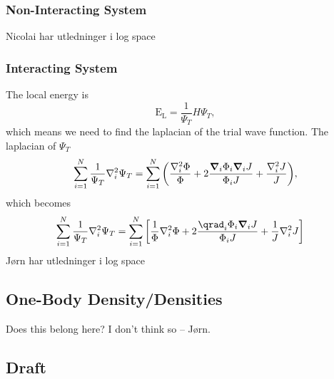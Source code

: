 \subsubsection*{Non-Interacting System}

Nicolai har utledninger i log space

\subsubsection*{Interacting System}
The local energy is 
\begin{equation}
    \mathrm{E}_{\mathrm{L}} = \frac{1}{\Psi_T}H\Psi_T, 
\end{equation}
which means we need to find the laplacian of the trial wave function. 
The laplacian of $\Psi_T$
\begin{equation}
    \sum_{i=1}^N\frac{1}{\Psi_T}\laplacian_i\Psi_T = \sum_{i=1}^N\qty(\frac{\laplacian_i\Phi}{\Phi} + 2\frac{\grad_i\Phi_i\grad_i J}{\Phi_i J} + \frac{\laplacian_i J}{J}), 
\end{equation}
which becomes 
\begin{align*}
    \sum_{i=1}^N\frac{1}{\Psi_T}\laplacian_i\Psi_T &= \sum_{i=1}^N\qty[\frac{1}{\Phi}\laplacian_i\Phi + 2\frac{\qrad_i\Phi_i\grad_i J}{\Phi_i J} + \frac{1}{J}\laplacian_i J]
\end{align*}
Jørn har utledninger i log space

\subsection{One-Body Density/Densities}

Does this belong here? I don't think so -- Jørn. 

\subsection{Draft}

